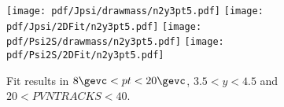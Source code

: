 \begin{figure}[H]
\begin{center}
\texttt{[image: pdf/Jpsi/drawmass/n2y3pt5.pdf]}
\texttt{[image: pdf/Jpsi/2DFit/n2y3pt5.pdf]}
\vspace*{-0.5cm}
\texttt{[image: pdf/Psi2S/drawmass/n2y3pt5.pdf]}
\texttt{[image: pdf/Psi2S/2DFit/n2y3pt5.pdf]}
\vspace*{-0.5cm}
\end{center}
\caption{Fit results in $8\gevc<pt<20\gevc$, $3.5<y<4.5$ and $20<PVNTRACKS<40$.}
\label{Fitn2y3pt5}
\end{figure}
